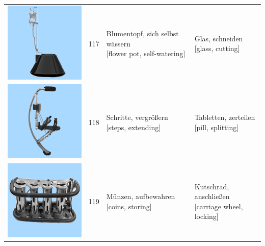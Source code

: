 \documentclass[
  english,
  man,floatsintext]{apa7}
\begin{document}
\begin{center}
\begin{ThreePartTable}
{\begin{longtable}{llll}
\includegraphics[valign=c, scale=0.23]{../materials/unfamiliar/117.png} & 117 & \makecell[l]{Blumentopf, sich selbst wässern\\{[flower pot, self-watering]}} & \makecell[l]{Glas, schneiden\\{[glass, cutting]}}\\
\includegraphics[valign=c, scale=0.23]{../materials/unfamiliar/118.png} & 118 & \makecell[l]{Schritte, vergrößern\\{[steps, extending]}} & \makecell[l]{Tabletten, zerteilen\\{[pill, splitting]}}\\
\includegraphics[valign=c, scale=0.23]{../materials/unfamiliar/119.png} & 119 & \makecell[l]{Münzen, aufbewahren\\{[coins, storing]}} & \makecell[l]{Kutschrad, anschließen\\{[carriage wheel, locking]}}\\

\end{longtable}}
\end{ThreePartTable}
\end{center}
\end{document}
